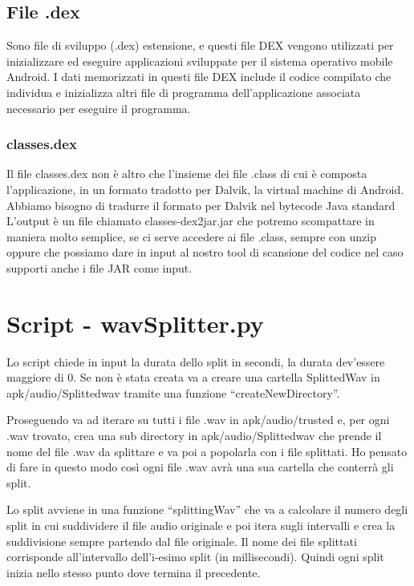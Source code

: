 \documentclass{article}
\begin{document}
\subsection{File .dex}
 Sono file di sviluppo (.dex) estensione, e questi file DEX vengono utilizzati per inizializzare ed eseguire applicazioni sviluppate per il sistema operativo mobile Android. I dati memorizzati in questi file DEX include il codice compilato che individua e inizializza altri file di programma dell'applicazione associata necessario per eseguire il programma. 
 \subsubsection{classes.dex}
  Il file classes.dex non è altro che l’insieme dei file .class di cui è composta l’applicazione, in un formato tradotto per Dalvik, la virtual machine di Android.
  \\Abbiamo bisogno di tradurre il formato per Dalvik nel bytecode Java standard
  \\L’output è un file chiamato classes-dex2jar.jar che potremo scompattare in maniera molto semplice, se ci serve accedere ai file .class, sempre con unzip oppure che possiamo dare in input al nostro tool di scansione del codice nel caso supporti anche i file JAR come input.
\section{Script - wavSplitter.py}
Lo script chiede in input la durata dello split in secondi, la durata dev’essere maggiore di 0.
Se non è stata creata va a creare una cartella Splitted\textunderscore Wav in apk/audio/Splitted\textunderscore wav  tramite una funzione “createNewDirectory”.

Proseguendo va ad iterare su tutti i file .wav in apk/audio/trusted
e, per ogni .wav trovato, crea una sub directory in apk/audio/Splitted\textunderscore wav che prende il nome del file .wav da splittare e va poi a popolarla con i file splittati.
Ho pensato di fare in questo modo così ogni file .wav avrà una sua cartella che conterrà gli split.

Lo split avviene in una funzione “splittingWav” che va a calcolare il numero degli split in cui suddividere il file audio originale e poi itera sugli intervalli e crea la suddivisione sempre partendo dal file originale.
Il nome dei file splittati corrisponde all’intervallo dell’i-esimo split (in millisecondi).
Quindi ogni split inizia nello stesso punto dove termina il precedente.
\end{document}
